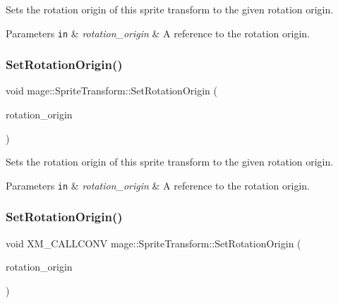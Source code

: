 Sets the rotation origin of this sprite transform to the given rotation origin.


\begin{DoxyParams}[1]{Parameters}
\mbox{\tt in}  & {\em rotation\+\_\+origin} & A reference to the rotation origin. \\
\hline
\end{DoxyParams}
\hypertarget{structmage_1_1_sprite_transform_a532771d53e650543d125ffb652671388}{}\label{structmage_1_1_sprite_transform_a532771d53e650543d125ffb652671388} 
\subsubsection{\texorpdfstring{Set\+Rotation\+Origin()}{SetRotationOrigin()}\hspace{0.1cm}{\footnotesize\ttfamily [3/4]}}
{\footnotesize\ttfamily void mage\+::\+Sprite\+Transform\+::\+Set\+Rotation\+Origin (\begin{DoxyParamCaption}\item[{X\+M\+F\+L\+O\+A\+T2 \&\&}]{rotation\+\_\+origin }\end{DoxyParamCaption})\hspace{0.3cm}{\ttfamily [noexcept]}}

Sets the rotation origin of this sprite transform to the given rotation origin.


\begin{DoxyParams}[1]{Parameters}
\mbox{\tt in}  & {\em rotation\+\_\+origin} & A reference to the rotation origin. \\
\hline
\end{DoxyParams}
\hypertarget{structmage_1_1_sprite_transform_acbb3eebc3fd26d616f5e4ca75a8c112b}{}\label{structmage_1_1_sprite_transform_acbb3eebc3fd26d616f5e4ca75a8c112b} 
\subsubsection{\texorpdfstring{Set\+Rotation\+Origin()}{SetRotationOrigin()}\hspace{0.1cm}{\footnotesize\ttfamily [4/4]}}
{\footnotesize\ttfamily void X\+M\+\_\+\+C\+A\+L\+L\+C\+O\+NV mage\+::\+Sprite\+Transform\+::\+Set\+Rotation\+Origin (\begin{DoxyParamCaption}\item[{F\+X\+M\+V\+E\+C\+T\+OR}]{rotation\+\_\+origin }\end{DoxyParamCaption})\hspace{0.3cm}{\ttfamily [noexcept]}}

